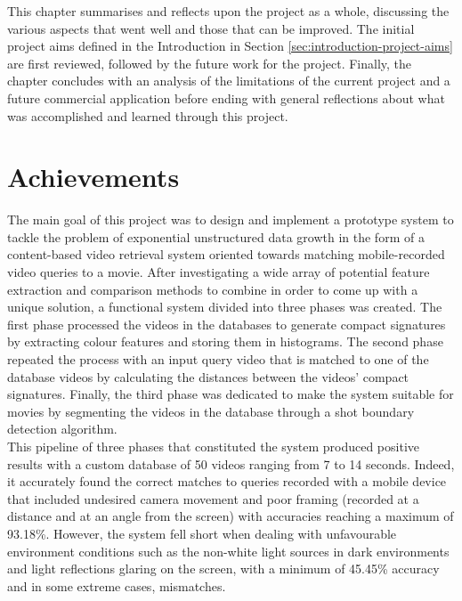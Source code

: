 This chapter summarises and reflects upon the project as a whole, discussing the various aspects that went well and those that can be improved. The initial project aims defined in the Introduction in Section \ref{sec:introduction-project-aims} are first reviewed, followed by the future work for the project. Finally, the chapter concludes with an analysis of the limitations of the current project and a future commercial application before ending with general reflections about what was accomplished and learned through this project.


\section{Achievements}

The main goal of this project was to design and implement a prototype system to tackle the problem of exponential unstructured data growth in the form of a content-based video retrieval system oriented towards matching mobile-recorded video queries to a movie. After investigating a wide array of potential feature extraction and comparison methods to combine in order to come up with a unique solution, a functional system divided into three phases was created. The first phase processed the videos in the databases to generate compact signatures by extracting colour features and storing them in histograms. The second phase repeated the process with an input query video that is matched to one of the database videos by calculating the distances between the videos' compact signatures. Finally, the third phase was dedicated to make the system suitable for movies by segmenting the videos in the database through a shot boundary detection algorithm.\\

This pipeline of three phases that constituted the system produced positive results with a custom database of 50 videos ranging from 7 to 14 seconds. Indeed, it accurately found the correct matches to queries recorded with a mobile device that included undesired camera movement and poor framing (recorded at a distance and at an angle from the screen) with accuracies reaching a maximum of 93.18\%. However, the system fell short when dealing with unfavourable environment conditions such as the non-white light sources in dark environments and light reflections glaring on the screen, with a minimum of 45.45\% accuracy and in some extreme cases, mismatches.\\

